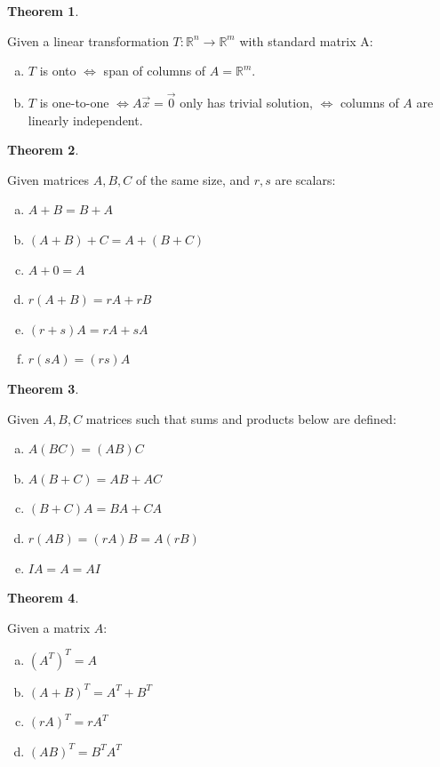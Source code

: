 \documentclass[a4paper,12pt]{article}
\theoremstyle{definition}
\newtheorem{theorem}{Theorem}
\theoremstyle{definition}
\newcommand{\mateq}[3]{#1#2 = #3}
\newcommand{\mateqaxo}{\mateq{A}{\vec{x}}{\vec{0}}}
\begin{document}
	\begin{theorem}
		\label{thm:onto-and-one-to-one-thm}
		
		Given a linear transformation $T: \mathbb{R}^n \rightarrow \mathbb{R}^m$ with standard matrix A:
		\begin{enumerate}[a.]
			\item $T$ is onto $\Leftrightarrow$ span of columns of $A = \mathbb{R}^m$.
			
			\item $T$ is one-to-one $\Leftrightarrow \mateqaxo$ only has trivial solution, $\Leftrightarrow$ columns of $A$ are linearly independent.
		\end{enumerate}
	\end{theorem}
	
	\begin{theorem}
		\label{thm:mat-add-sclmult-props}
		
		Given matrices $A, B, C$ of the same size, and $r, s$ are scalars:
		\begin{enumerate}[a.]
			\item $A + B = B + A$
			\item $(A + B) + C = A + (B + C)$
			\item $A + 0 = A$
			\item $r(A + B) = rA + rB$
			\item $(r + s)A = rA + sA$
			\item $r(sA) = (rs)A$
		\end{enumerate}
	\end{theorem}
	
	\begin{theorem}
		\label{thm:mat-mult-props}
		
		Given $A, B, C$ matrices such that sums and products below are defined:
		
		\begin{enumerate}[a.]
			\item $A(BC) = (AB)C$
			\item $A(B + C) = AB + AC$
			\item $(B + C)A = BA + CA$
			\item $r(AB) = (rA)B = A(rB)$
			\item $IA = A = AI$
		\end{enumerate}
	\end{theorem}
	
	\begin{theorem}
		\label{thm:mat-transpose-props}
		
		Given a matrix $A$:
		\begin{enumerate}[a.]
			\item $(A^T)^T = A$
			\item $(A + B)^T = A^T + B^T$
			\item $(rA)^T = rA^T$
			\item $(AB)^T = B^TA^T$
		\end{enumerate}
	\end{theorem}
	
\end{document}
